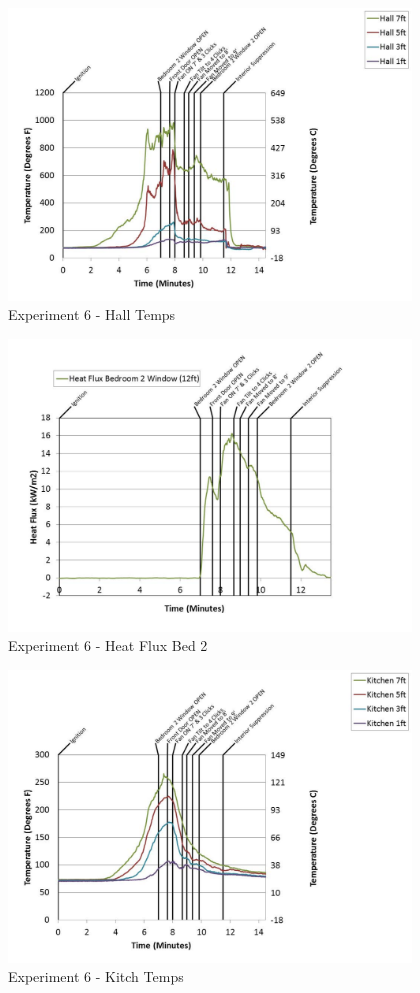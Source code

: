 \documentclass{article}
\begin{document}
\begin{appendices}
	\clearpage

	\begin{figure}[h!]
		\centering
		\includegraphics[height=3.05in]{0_Images/Results_Charts/Exp_6_Charts/HallTemps.pdf}
		\caption{Experiment 6 - Hall Temps}
	\end{figure}
 

	\begin{figure}[h!]
		\centering
		\includegraphics[height=3.05in]{0_Images/Results_Charts/Exp_6_Charts/HeatFluxBed2.pdf}
		\caption{Experiment 6 - Heat Flux Bed 2}
	\end{figure}
 
	\clearpage

	\begin{figure}[h!]
		\centering
		\includegraphics[height=3.05in]{0_Images/Results_Charts/Exp_6_Charts/KitchTemps.pdf}
		\caption{Experiment 6 - Kitch Temps}
	\end{figure}
 


\end{appendices}
\end{document}

